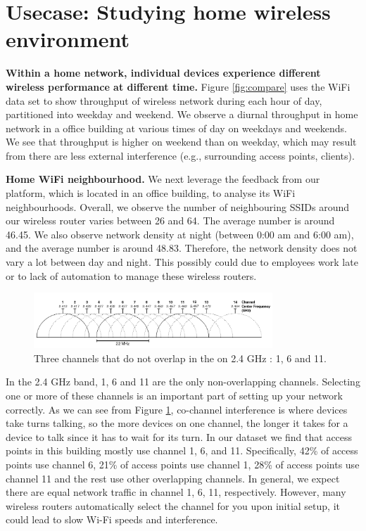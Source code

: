 \section{Usecase: Studying home wireless environment}
\label{sec.usecase3}

\textbf{Within a home network, individual devices experience different wireless performance at different time.} Figure \ref{fig:compare} uses the WiFi data set to show throughput of wireless network during each hour of day, partitioned into weekday and weekend. We observe a diurnal throughput in home network in a office building at various times of day on weekdays and weekends. We see that throughput is higher on weekend than on weekday, which may result from there are less external interference (e.g., surrounding access points, clients).

\textbf{Home WiFi neighbourhood.} We next leverage the feedback from our platform, which is located in an office building, to analyse its WiFi neighbourhoods. Overall, we observe the number of neighbouring SSIDs around our wireless router varies between 26 and 64. The average number is around 46.45. We also observe network density at night (between 0:00 am and 6:00 am), and the average number is around 48.83. Therefore, the network density does not vary a lot between day and night. This possibly could due to employees work late or to lack of automation to manage these wireless routers.

\begin{figure}
\centering
\includegraphics[width=0.8\textwidth]{figure/2GHz_WiFi_channels.png}
\caption{Three channels that do not overlap in the on 2.4 GHz : 1, 6 and 11.} 
\label{fig:channels}
\end{figure}

In the 2.4 GHz band, 1, 6 and 11 are the only non-overlapping channels. Selecting one or more of these channels is an important part of setting up your network correctly. As we can see from Figure \ref{fig:channels}, co-channel interference is where devices take turns talking, so the more devices on one channel, the longer it takes for a device to talk since it has to wait for its turn. In our dataset we find that access points in this building mostly use channel 1, 6, and 11. Specifically, 42\% of access points use channel 6, 21\% of access points use channel 1, 28\% of access points use channel 11 and the rest use other overlapping channels. In general, we expect there are equal network traffic in channel 1, 6, 11, respectively. However,  many wireless routers automatically select the channel for you upon initial setup, it could lead to slow Wi-Fi speeds and interference. 

